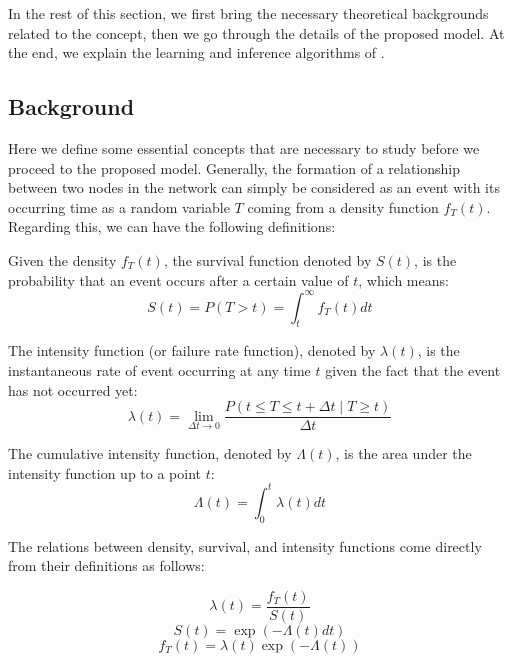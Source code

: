 In the rest of this section, we first bring the necessary theoretical backgrounds related to the concept, then we go through the details of the proposed model. At the end, we explain the learning and inference algorithms of \npglm.

\subsection{Background}
Here we define some essential concepts that are necessary to study before we proceed to the proposed model. Generally, the formation of a relationship between two nodes in the network can simply be considered as an event with its occurring time as a random variable $T$ coming from a density function $f_T(t)$. Regarding this, we can have the following definitions:

\begin{definition}
	Given the density $f_T(t)$, the survival function denoted by $S(t)$, is the probability that an event occurs after a certain value of $t$, which means:
	\begin{equation}
	S(t) = P(T > t) = \int_t^\infty f_T(t)dt
	\end{equation}
\end{definition}

\begin{definition}
	The intensity function (or failure rate function), denoted by $\lambda(t)$, is the instantaneous rate of event occurring at any time $t$ given the fact that the event has not occurred yet:
	\begin{equation}
	\lambda(t)=\lim_{\Delta t\rightarrow 0}\frac{P(t\le T\le t+\Delta t\mid T\ge t)}{\Delta t}
	\end{equation}
\end{definition}

\begin{definition}
	The cumulative intensity function, denoted by $\Lambda(t)$, is the area under the intensity function up to a point $t$:
	\begin{equation}
	\Lambda(t)=\int_0^t\lambda(t)dt
	\end{equation}
\end{definition}

The relations between density, survival, and intensity functions come directly from their definitions as follows:

\begin{equation}\label{eq:intensity}
\lambda(t)=\frac{f_T(t)}{S(t)}
\end{equation}
\begin{equation}\label{eq:reliability}
S(t)=\exp(-\Lambda(t)dt)
\end{equation}
\begin{equation}\label{eq:density}
f_T(t)=\lambda(t)\exp(-\Lambda(t))
\end{equation}


